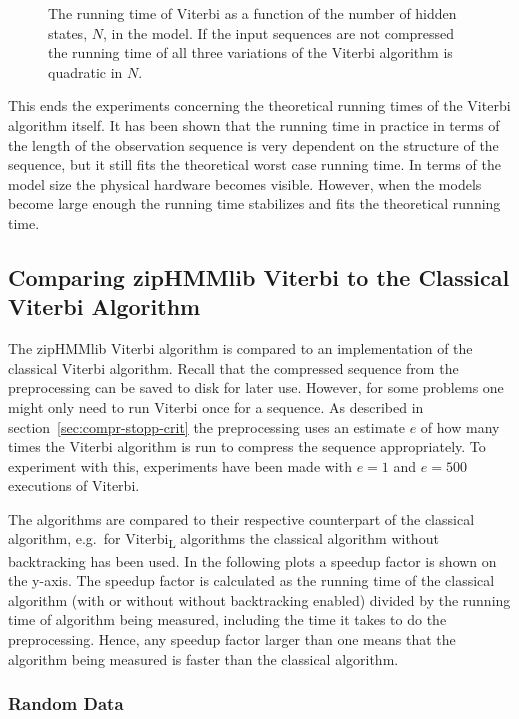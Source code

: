 \begin{figure}
  \centering
  
  \caption{The running time of Viterbi as a function of the number of hidden
    states, $N$, in the model. If the input sequences are not compressed the
    running time of all three variations of the Viterbi algorithm is quadratic
    in $N$.}
  \label{fig:assymptotic_viterbi_N}
\end{figure}

This ends the experiments concerning the theoretical running times of the
Viterbi algorithm itself. It has been shown that the running time in practice
in terms of the length of the observation sequence is very dependent on the
structure of the sequence, but it still fits the theoretical worst case running time. In
terms of the model size the physical hardware becomes visible. However, when
the models become large enough the running time stabilizes and fits the theoretical
running time.

\subsection{Comparing zipHMMlib Viterbi to the Classical Viterbi Algorithm}
\label{sec:comp-ziphmml-viterbi}

The zipHMMlib Viterbi algorithm is compared to an implementation of the
classical Viterbi algorithm. Recall that the compressed sequence from the
preprocessing can be saved to disk for later use. However, for some problems one
might only need to run Viterbi once for a sequence. As described in
section~\ref{sec:compr-stopp-crit} the preprocessing uses an estimate $e$ of
how many times the Viterbi algorithm is run to compress the sequence
appropriately.  To experiment with this, experiments have been made with
$e = 1$ and $e = 500$ executions of Viterbi.

The algorithms are compared to their respective counterpart of the classical
algorithm, e.g.\ for Viterbi\textsubscript{L} algorithms the classical
algorithm without backtracking has been used. In the following plots a
speedup factor is shown on the y-axis. The speedup factor is calculated as
the running time of the classical algorithm (with or without without backtracking
enabled) divided by the running time of algorithm being measured, including the
time it takes to do the preprocessing. Hence, any speedup factor larger than one
means that the algorithm being measured is faster than the classical algorithm.

\subsubsection{Random Data}

